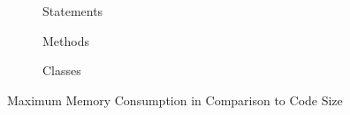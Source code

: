 \documentclass[../draft.tex]{subfiles}
\begin{document}
    \begin{figure}
        \centering
        \begin{subfigure}[b]{\textwidth}
            \centering
            \begin{subfigure}[]{0.45\textwidth}
                \centering
                \resizebox{\columnwidth}{!}{
                    
                }
            \end{subfigure}
            \qquad
            \begin{subfigure}[]{0.45\textwidth}
                \centering
                \resizebox{\columnwidth}{!}{
                    
                }
            \end{subfigure}
            \caption{Statements}
        \end{subfigure}
        \bigbreak
        \begin{subfigure}[b]{\textwidth}
            \centering
            \begin{subfigure}[]{0.45\textwidth}
                \centering
                \resizebox{\columnwidth}{!}{
                    
                }
            \end{subfigure}
            \qquad
            \begin{subfigure}[]{0.45\textwidth}
                \centering
                \resizebox{\columnwidth}{!}{
                    
                }
            \end{subfigure}
            \caption{Methods}
        \end{subfigure}
        \bigbreak
        \begin{subfigure}[b]{\textwidth}
            \centering
            \begin{subfigure}[]{0.45\textwidth}
                \centering
                \resizebox{\columnwidth}{!}{
                    
                }
            \end{subfigure}
            \qquad
            \begin{subfigure}[]{0.45\textwidth}
                \centering
                \resizebox{\columnwidth}{!}{
                    
                }
            \end{subfigure}
            \caption{Classes}
        \end{subfigure}
        \caption{Maximum Memory Consumption in Comparison to Code Size}
        \label{f:maxmemtocodesize}
    \end{figure}
    
\end{document}
